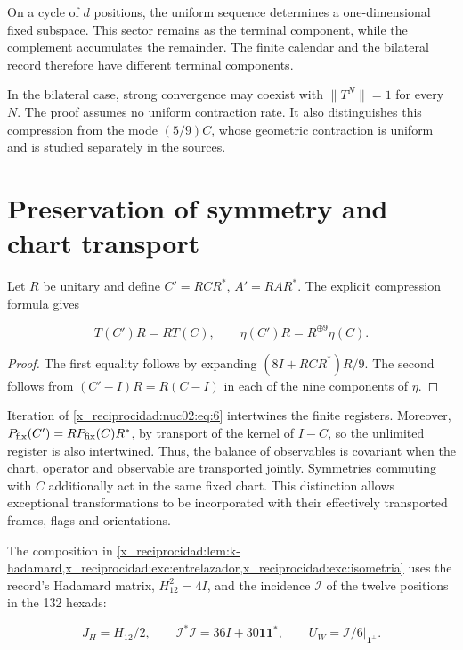 \begin{corollary}
On a cycle of \(d\) positions, the uniform sequence determines a one-dimensional fixed subspace. This sector remains as the terminal component, while the complement accumulates the remainder. The finite calendar and the bilateral record therefore have different terminal components.
\end{corollary}

In the bilateral case, strong convergence may coexist with \(\|T^N\|=1\) for every \(N\). The proof assumes no uniform contraction rate. It also distinguishes this compression from the mode \((5/9)C\), whose geometric contraction is uniform and is studied separately in the sources.

\section{Preservation of symmetry and chart transport}

Let \(R\) be unitary and define \(C'=RCR^*\), \(A'=RAR^*\). The explicit compression formula gives

\begin{equation}
T(C')R=RT(C),\qquad
\eta(C')R=R^{\oplus9}\eta(C).\label{x_reciprocidad:nuc02:eq:6}
\end{equation}

\begin{proof}
The first equality follows by expanding \((8I+RCR^*)R/9\). The second follows from \((C'-I)R=R(C-I)\) in each of the nine components of \(\eta\).
\end{proof}

Iteration of \eqref{x_reciprocidad:nuc02:eq:6} intertwines the finite registers. Moreover, \(P_{\rm fix}(C')=RP_{\rm fix}(C)R^*\), by transport of the kernel of \(I-C\), so the unlimited register is also intertwined. Thus, the balance of observables is covariant when the chart, operator and observable are transported jointly. Symmetries commuting with \(C\) additionally act in the same fixed chart. This distinction allows exceptional transformations to be incorporated with their effectively transported frames, flags and orientations.

The composition in \cref{x_reciprocidad:lem:k-hadamard,x_reciprocidad:exc:entrelazador,x_reciprocidad:exc:isometria} uses the record's Hadamard matrix, \(H_{12}^2=4I\), and the incidence \(\mathcal I\) of the twelve positions in the 132 hexads:

\[
J_H=H_{12}/2,\qquad
\mathcal I^*\mathcal I=36I+30\mathbf1\mathbf1^*,\qquad
U_W=\mathcal I/6\big|_{\mathbf1^\perp}.
\]

